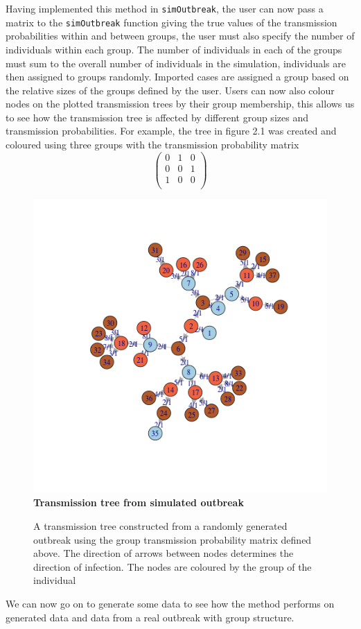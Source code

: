 \documentclass[11pt,a4paper]{report}
\begin{document}
Having implemented this method in {\tt simOutbreak}, the user can now pass a matrix to the {\tt simOutbreak} function giving the true values of the transmission probabilities within and between groups, the user must also specify the number of individuals within each group. The number of individuals in each of the groups must sum to the overall number of individuals in the simulation, individuals are then assigned to groups randomly. Imported cases are assigned a group based on the relative sizes of the groups defined by the user. Users can now also colour nodes on the plotted transmission trees by their group membership, this allows us to see how the transmission tree is affected by different group sizes and transmission probabilities. For example, the tree in figure 2.1 was created and coloured using three groups with the transmission probability matrix
\[ \left( \begin{array}{ccc}
0 & 1 & 0 \\
0 & 0 & 1 \\
1 & 0 & 0 \\
\end{array} \right) \]
\begin{figure}[h!]
\centering 
\includegraphics[scale=0.5]{treexample.png} \newline
{\bf Transmission tree from simulated outbreak}
\caption{A transmission tree constructed from a randomly generated outbreak using the group transmission probability matrix defined above. The direction of arrows between nodes determines the direction of infection. The nodes are coloured by the group of the individual}
\end{figure}
We can now go on to generate some data to see how the method performs on generated data and data from a real outbreak with group structure.
\end{document}
